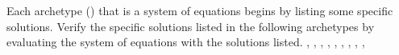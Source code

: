Each archetype () that is a system of equations begins by listing some specific solutions.  Verify the specific solutions listed in the following archetypes by evaluating the system of equations with the solutions listed.\newline\newline
{},
,
,
,
,
,
,
,
,
